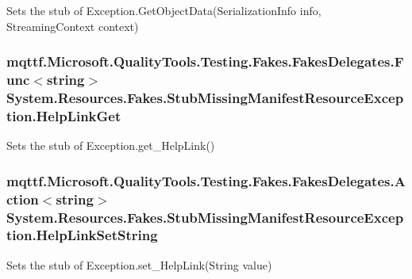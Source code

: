 Sets the stub of Exception.\-Get\-Object\-Data(\-Serialization\-Info info, Streaming\-Context context)

\hypertarget{class_system_1_1_resources_1_1_fakes_1_1_stub_missing_manifest_resource_exception_a398e67b7766b86e9595dd2127cc682af}{
\subsubsection[{Help\-Link\-Get}]{\setlength{\rightskip}{0pt plus 5cm}mqttf.\-Microsoft.\-Quality\-Tools.\-Testing.\-Fakes.\-Fakes\-Delegates.\-Func$<$string$>$ System.\-Resources.\-Fakes.\-Stub\-Missing\-Manifest\-Resource\-Exception.\-Help\-Link\-Get}}\label{class_system_1_1_resources_1_1_fakes_1_1_stub_missing_manifest_resource_exception_a398e67b7766b86e9595dd2127cc682af}


Sets the stub of Exception.\-get\-\_\-\-Help\-Link()

\hypertarget{class_system_1_1_resources_1_1_fakes_1_1_stub_missing_manifest_resource_exception_a4dde9962c85fd7e6cc3395f97a7059cf}{
\subsubsection[{Help\-Link\-Set\-String}]{\setlength{\rightskip}{0pt plus 5cm}mqttf.\-Microsoft.\-Quality\-Tools.\-Testing.\-Fakes.\-Fakes\-Delegates.\-Action$<$string$>$ System.\-Resources.\-Fakes.\-Stub\-Missing\-Manifest\-Resource\-Exception.\-Help\-Link\-Set\-String}}\label{class_system_1_1_resources_1_1_fakes_1_1_stub_missing_manifest_resource_exception_a4dde9962c85fd7e6cc3395f97a7059cf}


Sets the stub of Exception.\-set\-\_\-\-Help\-Link(\-String value)

